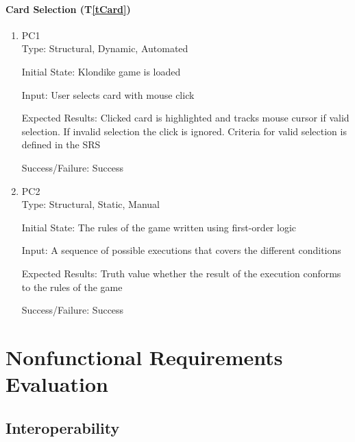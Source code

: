 \documentclass[12pt, titlepage]{article}
\newcommand{\tref}[1]{T\ref{#1}}
\begin{document}
	\paragraph{Card Selection (\tref{tCard})}
	\begin{enumerate}
		\item{PC1\\}
		Type: Structural, Dynamic, Automated
		
		Initial State: Klondike game is loaded
		
		Input: User selects card with mouse click
		
		Expected Results: Clicked card is highlighted and tracks mouse cursor if valid 
		selection. If invalid selection the click is ignored. Criteria for valid 
		selection is defined in the SRS

		Success/Failure: Success

		\item{PC2\\}
		Type: Structural, Static, Manual
		
		Initial State: The rules of the game written using first-order logic
		
		Input: A sequence of possible executions that covers the different conditions
		
		Expected Results: Truth value whether the result of the execution conforms to the rules
		of the game

		Success/Failure: Success
	\end{enumerate} 



\section{Nonfunctional Requirements Evaluation}

\subsection{Interoperability}
	
\end{document}
